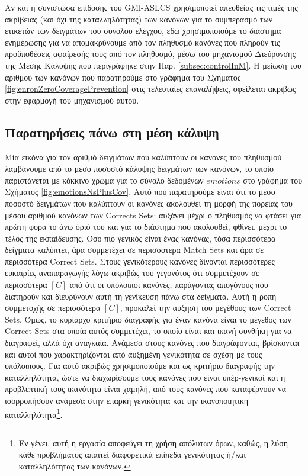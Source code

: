 Αν και η συνιστώσα επίδοσης του GMl-ASLCS χρησιμοποιεί απευθείας τις τιμές της ακρίβειας (και όχι της καταλληλότητας) των κανόνων για το συμπερασμό των ετικετών των δειγμάτων του συνόλου ελέγχου, εδώ χρησιμοποιούμε το διάστημα ενημέρωσης για να απομακρύνουμε από τον πληθυσμό κανόνες που πληρούν τις προϋποθέσεις αφαίρεσής τους από τον πληθυσμό, μέσω του μηχανισμού Διεύρυνσης της Μέσης Κάλυψης που περιγράφηκε στην Παρ. \ref{subsec:controlInM}. Η μείωση του αριθμού των κανόνων που παρατηρούμε στο γράφημα του Σχήματος \ref{fig:enronZeroCoveragePrevention} στις τελευταίες επαναλήψεις, οφείλεται ακριβώς στην εφαρμογή του μηχανισμού αυτού.

 


\subsection{Παρατηρήσεις πάνω στη μέση κάλυψη} 
\label{subsec:commentsOnCov}
Μία εικόνα για τον αριθμό δειγμάτων που καλύπτουν οι κανόνες του πληθυσμού λαμβάνουμε από το μέσο ποσοστό κάλυψης δειγμάτων των κανόνων, το οποίο παριστάνεται με κόκκινο χρώμα για το σύνολο δεδομένων $emotions$ στο γράφημα του Σχήματος \ref{fig:emotionsNsPlusCov}. Αυτό που παρατηρούμε είναι ότι το μέσο ποσοστό δειγμάτων που καλύπτουν οι κανόνες ακολουθεί τη μορφή της πορείας του μέσου αριθμού κανόνων των Corrects Sets: αυξάνει μέχρι ο πληθυσμός να φτάσει για πρώτη φορά το άνω όριό του και για το διάστημα που ακολουθεί, φθίνει, μέχρι το τέλος της εκπαίδευσης. Όσο πιο γενικός είναι ένας κανόνας, τόσα περισσότερα δείγματα καλύπτει, άρα συμμετέχει σε περισσότερα Match Sets και άρα σε περισσότερα Correct Sets. Στους γενικότερους κανόνες δίνονται περισσότερες ευκαιρίες αναπαραγωγής λόγω ακριβώς του γεγονότος ότι συμμετέχουν σε περισσότερα $[C]$ από ότι οι υπόλοιποι κανόνες, παράγοντας απογόνους που διατηρούν και διευρύνουν αυτή τη γενίκευση πάνω στα δείγματα. Αυτή η ροπή συμμετοχής σε περισσότερα $[C]$, προκαλεί την αύξηση του μεγέθους των Correct Sets. Όμως, το κυρίαρχο κριτήριο διαγραφής για έναν κανόνα είναι το μέγεθος των Correct Sets στα οποία αυτός συμμετέχει, το οποίο είναι και ικανή συνθήκη για να διαγραφεί, αλλά όχι αναγκαία. Ανάμεσα στους κανόνες που διαγράφονται, βρίσκονται και αυτοί που χαρακτηρίζονται από αυξημένη γενικότητα σε σχέση με τους υπόλοιπους. Για αυτό ακριβώς χρησιμοποιούμε και ως κριτήριο διαγραφής την καταλληλότητα, ώστε να διαχωρίσουμε τους κανόνες που είναι υπέρ-γενικοί και η προβλεπτική τους ικανότητα είναι χαμηλή, από τους κανόνες που καταφέρνουν να ισορροπήσουν ανάμεσα στην επαρκή γενικότητα και την ικανοποιητική καταλληλότητα\footnote{Εν γένει, αυτή η εργασία αποφεύγει τη χρήση απόλυτων όρων, καθώς, η λύση κάθε προβλήματος απαιτεί διαφορετικά επίπεδα γενικότητας ή/και καταλληλότητας των κανόνων.}.


